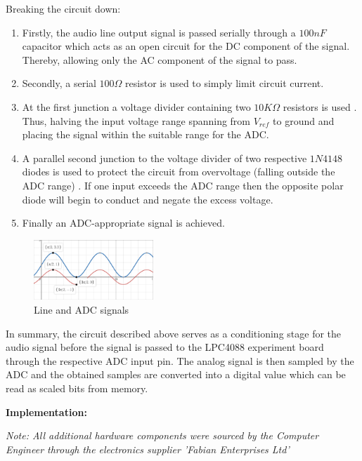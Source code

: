 \documentclass{cce2014-design}
\begin{document}
\pagebreak
Breaking the circuit down:
\begin{enumerate}
   \item Firstly, the audio line output signal is passed serially through a $100nF$ capacitor which acts as an open circuit for the DC component of the signal. Thereby, allowing only the AC component of the signal to pass.
   \item Secondly, a serial $100\Omega$ resistor is used to simply limit circuit current.
   \item At the first junction a voltage divider containing two $10K\Omega$ resistors is used \cite{VoltageDividerWiki}. Thus, halving the input voltage range spanning from $V_{ref}$ to ground and placing the signal within the suitable range for the ADC.
   \item A parallel second junction to the voltage divider of two respective $1N4148$ diodes is used to protect the circuit from overvoltage (falling outside the ADC range) \cite{1n4148-datasheet}. If one input exceeds the ADC range then the opposite polar diode will begin to conduct and negate the excess voltage.
   \item Finally an ADC-appropriate signal is achieved.
\end{enumerate}

\begin{figure}[!ht]
   \centering
   \includegraphics[width=0.4\textwidth]{LinetoADC.png}
   \caption{Line and ADC signals}
\end{figure}

In summary, the circuit described above serves as a conditioning stage for the audio signal before the signal is passed to the LPC4088 experiment board through the respective ADC input pin.
The analog signal is then sampled by the ADC and the obtained samples are converted into a digital value which can be read as scaled bits from memory.

\vspace{1em}
\textbf{Implementation:}

\emph{Note: All additional hardware components were sourced by the Computer Engineer through the electronics supplier 'Fabian Enterprises Ltd'}
\end{document}
